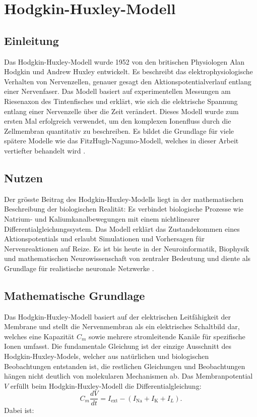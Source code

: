 \section{Hodgkin-Huxley-Modell}
%
\subsection{Einleitung}
Das Hodgkin-Huxley-Modell wurde 1952 von den britischen Physiologen Alan Hodgkin und Andrew Huxley entwickelt. Es beschreibt das elektrophysiologische Verhalten von Nervenzellen, genauer gesagt den Aktionspotentialverlauf entlang einer Nervenfaser. Das Modell basiert auf experimentellen Messungen am Riesenaxon des Tintenfisches und erklärt, wie sich die elektrische Spannung entlang einer Nervenzelle über die Zeit verändert. Dieses Modell wurde zum ersten Mal erfolgreich verwendet, um den komplexen Ionenfluss durch die Zellmembran quantitativ zu beschreiben. Es bildet die Grundlage für viele spätere Modelle wie das FitzHugh-Nagumo-Modell, welches in dieser Arbeit vertiefter behandelt wird 
\cite{nerven:InaLammers.31.08.2015}.
%
%
%
%
%
\subsection{Nutzen}
Der grösste Beitrag des Hodgkin-Huxley-Modells liegt in der mathematischen Beschreibung der biologischen Realität: Es verbindet biologische Prozesse wie Natrium- und Kaliumkanalbewegungen mit einem nichtlinearer Differentialgleichungssystem. Das Modell erklärt das Zustandekommen eines Aktionspotentials und erlaubt Simulationen und Vorhersagen für Nervenreaktionen auf Reize. Es ist bis heute in der Neuroinformatik, Biophysik und mathematischen Neurowissenschaft von zentraler Bedeutung und diente als Grundlage für realistische neuronale Netzwerke 
%
%
%
\cite{nerven:InaLammers.31.08.2015}.
\subsection{Mathematische Grundlage}
Das Hodgkin-Huxley-Modell basiert auf der elektrischen Leitfähigkeit der Membrane und stellt die Nervenmembran als ein elektrisches Schaltbild dar, welches eine Kapazität $C_m$ sowie mehrere stromleitende Kanäle für spezifische Ionen umfasst.
%
%
Die fundamentale Gleichung ist der einzige Ausschnitt des
Hodgkin-Huxley-Models, welcher aus natürlichen und biologischen
Beobachtungen entstanden ist, die restlichen Gleichungen und
Beobachtungen hängen nicht deutlich von molekularen Mechanismen ab.
Das Membranpotential $V$ erfüllt beim Hodgkin-Huxley-Modell die
Differentialgleichung:
\[
C_m \frac{dV}{dt} = I_{\text{ext}} - (I_{\text{Na}} + I_{\text{K}} + I_L).
\] 
Dabei ist:

